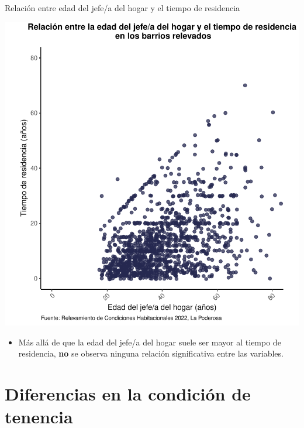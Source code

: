 \documentclass[aspectratio=169]{beamer}
\begin{document}
    \begin{frame}{Relación entre edad del jefe/a del hogar y el tiempo de residencia}
         \begin{minipage}{.45\linewidth}
            \begin{overlayarea}{\linewidth}{.75\textheight}
                \includegraphics[height=.75\textheight]{graficas-pdf/edad-jefe-tiempo-residencia.pdf}
            \end{overlayarea}
        \end{minipage}
        \begin{minipage}{.54\linewidth}
            \setlength{\leftmargini}{12pt}
            \begin{itemize}
                \item<2-> Más allá de que la edad del jefe/a del hogar suele ser mayor al tiempo de residencia, \textbf{no} se observa ninguna relación significativa entre las variables.
            \end{itemize}
        \end{minipage}
    \end{frame}
    
    \section{Diferencias en la condición de tenencia}
    \begin{frame}
        \tableofcontents[currentsection]
    \end{frame} 
\end{document}
